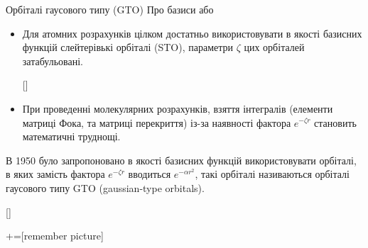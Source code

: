 \documentclass[10pt]{beamer}
\begin{document}
\begin{frame}{Орбіталі гаусового типу (GTO)}\small
	{\scriptsize Про базиси  або }
	\begin{itemize}\small
		\item Для \alert{атомних розрахунків} цілком достатньо використовувати в якості базисних функцій слейтерівькі орбіталі (STO), параметри $\zeta$ цих орбіталей затабульовані.

		      {\scriptsize []}

		\item При проведенні \alert{молекулярних розрахунків}, взяття інтегралів (елементи матриці Фока, та матриці перекриття) із-за наявності фактора $e^{-\zeta r}$ становить математичні труднощі.
	\end{itemize}
	В 1950 було запропоновано в якості базисних функцій використовувати орбіталі, в яких замість фактора $e^{-\zeta r}$ вводиться $e^{-\alpha r^2}$, такі орбіталі називаються орбіталі гаусового типу GTO (gaussian-type orbitals).

		{\scriptsize []}
\end{frame}





+=[remember picture]
\end{document}
